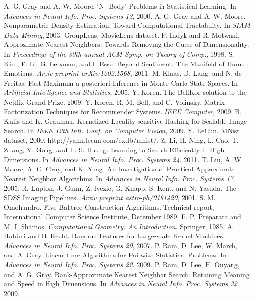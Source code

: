 \documentclass[twocolumn]{article}
\begin{document}
\begin{thebibliography}{1}
 A. G. Gray and A. W. Moore. ‘N -Body’ Problems in Statistical Learning. In \emph{Advances in Neural Info. Proc. Systems 13}, 2000.
 A. G. Gray and A. W. Moore. Nonparametric Density Estimation: Toward Computational Tractability. In \emph{SIAM Data Mining}, 2003.
 GroupLens. MovieLens dataset.
 P. Indyk and R. Motwani. Approximate Nearest Neighbors: Towards Removing the Curse of Dimensionality. In \emph{Proceedings of the 30th annual ACM Symp. on Theory of Comp.}, 1998.
 S. Kim, F. Li, G. Lebanon, and I. Essa. Beyond Sentiment: The Manifold of Human Emotions. \emph{Arxiv preprint arXiv:1202.1568}, 2011.
 M. Klaas, D. Lang, and N. de Freitas. Fast Maximum-a-posteriori Inference in Monte Carlo State Spaces. In \emph{Artificial Intelligence and Statistics}, 2005.
 Y. Koren. The BellKor solution to the Netflix Grand Prize. 2009.
 Y. Koren, R. M. Bell, and C. Volinsky. Matrix Factorization Techniques for Recommender Systems. \emph{IEEE Computer}, 2009.
 B. Kulis and K. Grauman. Kernelized Locality-sensitive Hashing for Scalable Image Search.  In \emph{IEEE 12th Intl. Conf. on Computer Vision}, 2009.
 Y. LeCun. MNist dataset, 2000. http://yann.lecun.com/exdb/mnist/.
 Z. Li, H. Ning, L. Cao, T. Zhang, Y. Gong, and T. S. Huang. Learning to Search Efficiently in High Dimensions. In \emph{Advances in Neural Info. Proc. Systems 24}. 2011.
 T. Liu, A. W. Moore, A. G. Gray, and K. Yang. An Investigation of Practical Approximate Nearest Neighbor Algorithms. In \emph{Advances in Neural Info. Proc. Systems 17}, 2005.
 R. Lupton, J. Gunn, Z. Ivezic, G. Knapp, S. Kent, and N. Yasuda. The SDSS Imaging Pipelines. \emph{Arxiv preprint astro-ph/0101420}, 2001.
 S. M. Omohundro. Five Balltree Construction Algorithms. Technical report, International Computer Science Institute, December 1989.
 F. P. Preparata and M. I. Shamos. \emph{Computational Geometry: An Introduction}. Springer, 1985.
 A. Rahimi and B. Recht. Random Features for Large-scale Kernel Machines. \emph{Advances in Neural Info. Proc. Systems 20}, 2007.
 P. Ram, D. Lee, W. March, and A. Gray. Linear-time Algorithms for Pairwise Statistical Problems. In \emph{Advances in Neural Info. Proc. Systems 22}. 2009.
 P. Ram, D. Lee, H. Ouyang, and A. G. Gray. Rank-Approximate Nearest Neighbor Search: Retaining Meaning and Speed in High Dimensions. In \emph{Advances in Neural Info. Proc. Systems 22}. 2009.
\end{thebibliography}
\end{document}
